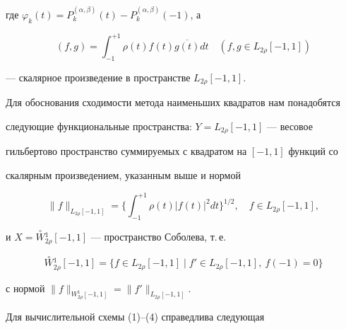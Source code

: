 где $\varphi_k(t)=P_k^{(\alpha,\beta)}(t)-P_k^{(\alpha,\beta)}(-1)$, а 


$$


(f,g)=\int_{-1}^{+1}\rho(t)f(t)\overline{g(t)}dt\quad (f,g\in L_{2\rho}[-1,1])


$$


--- скалярное произведение в пространстве $L_{2\rho}[-1,1]$.





Для обоснования сходимости метода наименьших квадратов нам понадобятся 


следующие функциональные пространства: $Y=L_{2\rho}[-1,1]$ --- весовое 


гильбертово пространство суммируемых с квадратом на $[-1,1]$ функций со 


скалярным произведением, указанным выше и нормой 


$$


\|f\|_{L_{2\rho}[-1,1]}=\bigg\{\int_{-1}^{+1}\rho(t)|f(t)|^2 dt\bigg\}^{1/2},


\quad f\in L_{2\rho}[-1,1],


$$


и $X=\overset{\circ}{W}{}_{2\rho}^1[-1,1]$ --- пространство Соболева, т.\,е.


$$ 


\overset{\circ}{W}{}_{2\rho}^1[-1,1]=\{ f\in L_{2\rho}[-1,1]\mid


f'\in L_{2\rho}[-1,1],\ f(-1)=0\}


$$ 


с нормой $\|f\|_{W_{2\rho}^1[-1,1]} =\|f'\|_{L_{2\rho}[-1,1]}$.








Для вычислительной схемы (1)--(4) справедлива следующая








